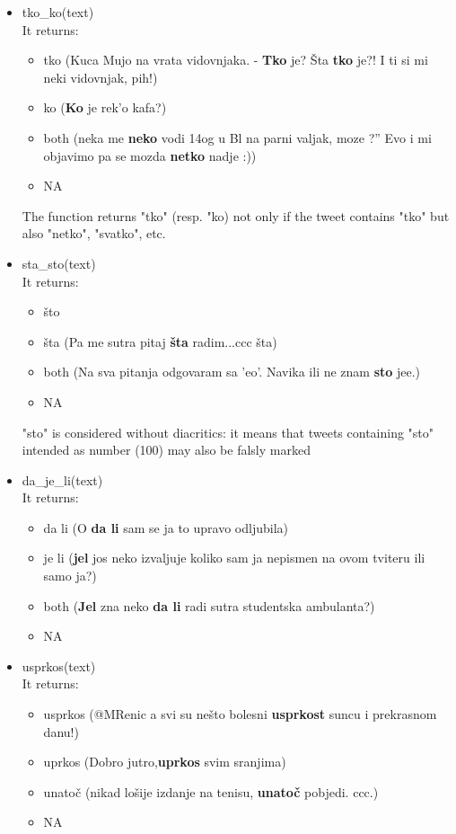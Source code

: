 \documentclass[a4paper]{article}
\begin{document}
\begin{itemize}
\item tko\_ko(text)\\
It returns:
\begin{itemize}
\item tko (Kuca Mujo na vrata vidovnjaka. - \textbf{Tko} je? Šta \textbf{tko} je?! I ti si mi neki vidovnjak, pih!)
\item ko (\textbf{Ko} je rek'o kafa?)
\item both (neka me \textbf{neko} vodi 14og u Bl na parni valjak, moze ?” Evo i mi objavimo pa se mozda \textbf{netko} nadje :))
\item NA
\end{itemize}

The function returns "tko" (resp. "ko) not only if the tweet contains "tko" but also "netko", "svatko", etc.

\item sta\_sto(text)\\
It returns:
\begin{itemize}
\item što %
\item šta (Pa me sutra pitaj \textbf{šta} radim...ccc	šta)%
\item both (Na sva pitanja odgovaram sa 'eo'. Navika ili ne znam \textbf{sto} jee.)
\item NA
\end{itemize}
"sto" is considered without diacritics: it means that tweets containing "sto" intended as number (100) may also be falsly marked



\item da\_je\_li(text)\\
It returns:
\begin{itemize}
\item da li (O \textbf{da li} sam se ja to upravo odljubila)
\item je li (\textbf{jel} jos neko izvaljuje koliko sam ja nepismen na ovom tviteru ili samo ja?)
\item both (\textbf{Jel} zna neko \textbf{da li} radi sutra studentska ambulanta?)
\item NA
\end{itemize}

\item usprkos(text)\\
It returns:
\begin{itemize}
\item usprkos (@MRenic a svi su nešto bolesni \textbf{usprkost} suncu i prekrasnom danu!)
\item uprkos (Dobro jutro,\textbf{uprkos} svim sranjima)
\item unatoč (nikad lošije izdanje na tenisu, \textbf{unatoč} pobjedi. ccc.)
\item NA
\end{itemize}


\end{itemize}
\end{document}

